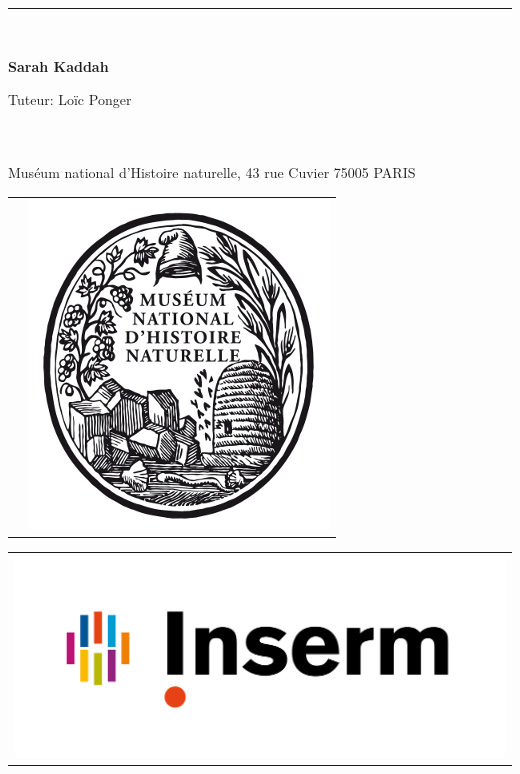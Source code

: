 \documentclass[12pt,a4paper]{article}
\newcommand{\HRule}{\rule{\linewidth}{0.5mm}}
\begin{document}
\begin{titlepage}
\begin{sffamily}
\begin{center}
    \HRule \\%
\begin{center}\LARGE{\textbf{Sarah Kaddah}}\end{center}
\begin{center}\Large{Tuteur: Lo\"{i}c Ponger}\end{center}~\\
\\
Muséum national d'Histoire naturelle, 43 rue Cuvier 75005 PARIS \\ [1cm]
\begin{tabular}{cc}
	\hspace*{2.5cm} &  
	\includegraphics[scale=0.2]{img/mnhn.jpg}
\end{tabular}
	\hfill
\begin{tabular}{c}
	\includegraphics[scale=0.08]{img/inserm.jpg}
\end{tabular}
	\hfill
\begin{tabular}{cc}

\end{tabular}
\end{center}
\end{sffamily}
\end{titlepage}
\end{document}
